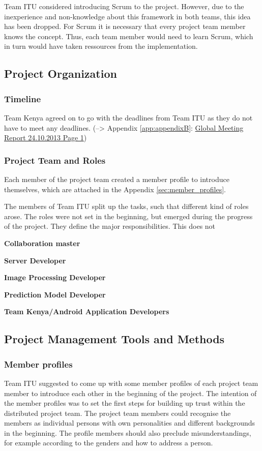 Team ITU considered introducing Scrum to the project. However, due to the inexperience and non-knowledge about this framework in both teams, this idea has been dropped. For Scrum it is necessary that every project team member knows the concept. Thus, each team member would need to learn Scrum, which in turn would have taken ressources from the implementation.


\subsection{Project Organization}

\subsubsection{Timeline}
Team Kenya agreed on to go with the deadlines from Team ITU as they do not have to meet any deadlines. (--> Appendix \ref{app:appendixB}: \hyperlink{GSD20131024.1}{Global Meeting Report 24.10.2013 Page 1})

\subsubsection{Project Team and Roles}
Each member of the project team created a member profile to introduce themselves, which are attached in the Appendix \ref{sec:member_profiles}.

The members of Team ITU split up the tasks, such that different kind of roles arose. The roles were not set in the beginning, but emerged during the progress of the project. They define the major responsibilities. This does not

\textbf{Collaboration master}

\textbf{Server Developer}

\textbf{Image Processing Developer}

\textbf{Prediction Model Developer}

\textbf{Team Kenya/Android Application Developers}



\subsection{Project Management Tools and Methods}

\subsubsection {Member profiles}
Team ITU suggested to come up with some member profiles of each project team member to introduce each other in the beginning of the project. The intention of the member profiles was to set the first steps for building up trust within the distributed project team. The project team members could recognise the members as individual persons with own personalities and different backgrounds in the beginning. The profile members should also preclude misunderstandings, for example according to the genders and how to address a person.

